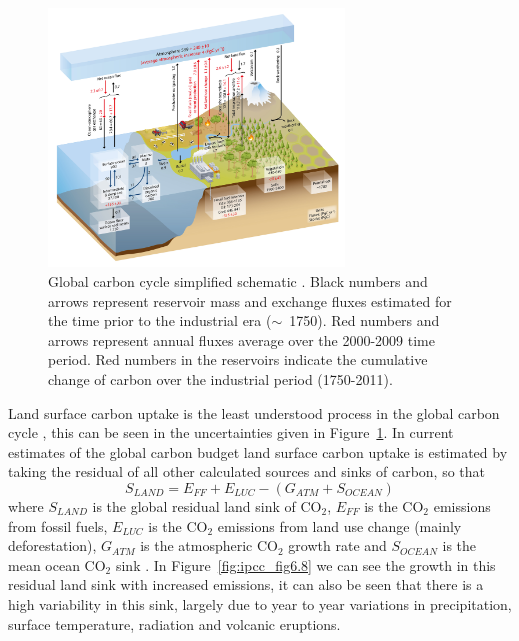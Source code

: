 \documentclass[11pt]{article}
\begin{document}
\begin{figure}[ht]
    \centering
    \includegraphics[width=0.7\textwidth]{ipcc_fig6_1.jpg}
    \caption{Global carbon cycle simplified schematic \citep{ciais2014carbon}. Black numbers and arrows represent reservoir mass and exchange fluxes estimated for the time prior to the industrial era (\(\sim\)~1750). Red numbers and arrows represent annual fluxes average over the 2000-2009 time period. Red numbers in the reservoirs indicate the cumulative change of carbon over the industrial period (1750-2011).}
    \label{fig:ipcc_fig6.1}
\end{figure}

Land surface carbon uptake is the least understood process in the global carbon cycle \citep{ciais2014carbon}, this can be seen in the uncertainties given in Figure~\ref{fig:ipcc_fig6.1}. In current estimates of the global carbon budget land surface carbon uptake is estimated by taking the residual of all other calculated sources and sinks of carbon, so that
\begin{equation}
S_{LAND} = E_{FF} + E_{LUC} - (G_{ATM} + S_{OCEAN})
\end{equation}  
where \(S_{LAND}\) is the global residual land sink of CO\(_{2}\), \(E_{FF}\) is the CO\(_{2}\) emissions from fossil fuels, \(E_{LUC}\) is the CO\(_{2}\) emissions from land use change (mainly deforestation), \(G_{ATM}\) is the atmospheric CO\(_{2}\) growth rate and \(S_{OCEAN}\) is the mean ocean CO\(_{2}\) sink \citep{le2015global}. In Figure~\ref{fig:ipcc_fig6.8} we can see the growth in this residual land sink with increased emissions, it can also be seen that there is a high variability in this sink, largely due to year to year variations in precipitation, surface temperature, radiation and volcanic eruptions.
\end{document}
